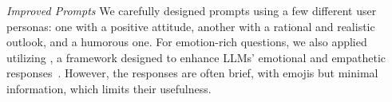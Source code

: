 \textit{Improved Prompts}
We carefully designed prompts using a few different user personas: one with a positive attitude, another with a rational and realistic outlook, and a humorous one. For emotion-rich questions, we also applied \gptfouro utilizing \ecot, a framework designed to enhance LLMs’ emotional and empathetic responses~\cite{li2024ecot}. However, the responses are often brief, with emojis but minimal information, which limits their usefulness.









